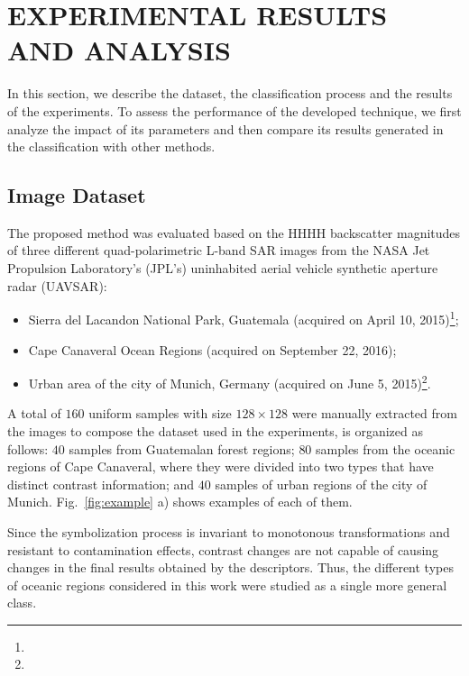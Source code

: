 \documentclass[journal]{IEEEtran}
\begin{document}
\section{EXPERIMENTAL RESULTS AND ANALYSIS}\label{Results}

In this section, we describe the dataset, the classification process and the results of the experiments.
To assess the performance of the developed technique, we first analyze the impact of its parameters and then compare its results generated in the classification with other methods.

\subsection{Image Dataset}

The proposed method was evaluated based on the HHHH backscatter magnitudes of three different quad-polarimetric L-band SAR images from the NASA Jet Propulsion Laboratory’s (JPL’s) uninhabited aerial vehicle synthetic aperture radar (UAVSAR):
\begin{itemize}
	\item Sierra del Lacandon National Park, Guatemala (acquired on April 10, 2015)\footnote{};
	\item Cape Canaveral Ocean Regions (acquired on September 22, 2016);
	\item Urban area of the city of Munich, Germany (acquired on June 5, 2015)\footnote{}.
\end{itemize}

A total of $160$ uniform samples with size $128 \times 128$ were manually extracted from the images to compose the dataset used in the experiments, is organized as follows:
$40$ samples from Guatemalan forest regions;
$80$ samples from the oceanic regions of Cape Canaveral, where they were divided into two types that have distinct contrast information; and
$40$ samples of urban regions of the city of Munich.
Fig.~\ref{fig:example} a) shows examples of each of them.

Since the symbolization process is invariant to monotonous transformations and resistant to contamination effects, contrast changes are not capable of causing changes in the final results obtained by the descriptors.
Thus, the different types of oceanic regions considered in this work were studied as a single more general class.
\end{document}
